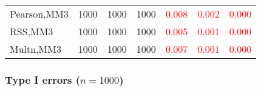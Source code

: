 \documentclass[
]{article}
\begin{document}
\begin{table}[H]
{\begin{tabular}[t]{lrrrrrr}
\hspace{1em}Pearson,MM3 & 1000 & 1000 & 1000 & \textcolor{red}{0.008} & \textcolor{red}{0.002} & \textcolor{red}{0.000}\\
\hspace{1em}RSS,MM3 & 1000 & 1000 & 1000 & \textcolor{red}{0.005} & \textcolor{red}{0.001} & \textcolor{red}{0.000}\\
\hspace{1em}Multn,MM3 & 1000 & 1000 & 1000 & \textcolor{red}{0.007} & \textcolor{red}{0.001} & \textcolor{red}{0.000}\\
\bottomrule
\end{tabular}}
\endgroup{}
\end{table}

\hypertarget{type-i-errors-n1000-3}{%
\subsubsection{\texorpdfstring{Type I errors
(\(n=1000\))}{Type I errors (n=1000)}}\label{type-i-errors-n1000-3}}
\end{document}
